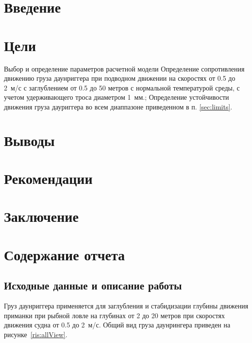 \documentclass[russian,utf8, pointsubsection]{eskdtext}
\begin{document}



\tableofcontents

\newpage
\section{Введение}
\section{Цели}
\pointsection Выбор и определение параметров расчетной модели
\pointsection \label{sec:limits} Определение сопротивления движению груза даунриггера при подводном движении на скоростях от 0.5 до 2~м/с с заглублением от 0.5 до 50 метров с нормальной температурой среды, с учетом удерживающего троса диаметром 1~мм.;
\pointsection Определение устойчивости движения груза дауриггера во всем диаппазоне приведенном в п. \ref{sec:limits}.

\section{Выводы}
\section{Рекомендации}
\section{Заключение}
\section{Содержание отчета}
\subsection{Исходные данные и описание работы}

Груз даунриггера применяется для заглубления и стабидизации глубины движения приманки при рыбной ловле на глубинах от 2 до 20 метров при скоростях движения судна  от 0.5 до 2~м/с. Общий вид груза даунрингера приведен на рисунке~\ref{ris:allView}.
\end{document}
